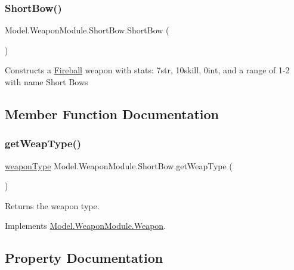 \subsubsection{\texorpdfstring{Short\+Bow()}{ShortBow()}}
{\footnotesize\ttfamily Model.\+Weapon\+Module.\+Short\+Bow.\+Short\+Bow (\begin{DoxyParamCaption}{ }\end{DoxyParamCaption})\hspace{0.3cm}{\ttfamily [inline]}}

Constructs a \hyperlink{class_model_1_1_weapon_module_1_1_fireball}{Fireball} weapon with stats\+: 7str, 10skill, 0int, and a range of 1-\/2 with name Short Bows 

\subsection{Member Function Documentation}
\hypertarget{class_model_1_1_weapon_module_1_1_short_bow_a50b5acd4e433303752e04397aeea86df}{}\label{class_model_1_1_weapon_module_1_1_short_bow_a50b5acd4e433303752e04397aeea86df} 
\subsubsection{\texorpdfstring{get\+Weap\+Type()}{getWeapType()}}
{\footnotesize\ttfamily \hyperlink{namespace_model_1_1_weapon_module_a3390c266f89e3399c2bc7fa31f13cbec}{weapon\+Type} Model.\+Weapon\+Module.\+Short\+Bow.\+get\+Weap\+Type (\begin{DoxyParamCaption}{ }\end{DoxyParamCaption})\hspace{0.3cm}{\ttfamily [inline]}}

Returns the weapon type. 

Implements \hyperlink{interface_model_1_1_weapon_module_1_1_weapon_a175133855ef446d3d87c70d13979be9c}{Model.\+Weapon\+Module.\+Weapon}.



\subsection{Property Documentation}
\hypertarget{class_model_1_1_weapon_module_1_1_short_bow_a194e2a18288333ab473162ecc0e03f06}{}\label{class_model_1_1_weapon_module_1_1_short_bow_a194e2a18288333ab473162ecc0e03f06} 
